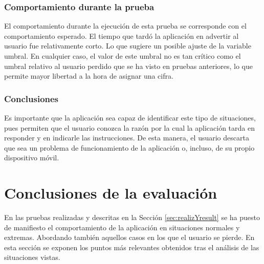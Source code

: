 \subsubsection*{Comportamiento durante la prueba}

El comportamiento durante la ejecución de esta prueba se corresponde con el comportamiento esperado. El tiempo que tardó la aplicación en advertir al usuario fue relativamente corto. Lo que sugiere un posible ajuste de la variable umbral. En cualquier caso, el valor de este umbral no es tan crítico como el umbral relativo al usuario perdido que se ha visto en pruebas anteriores, lo que permite mayor libertad a la hora de asignar una cifra.

\subsubsection*{Conclusiones}

Es importante que la aplicación sea capaz de identificar este tipo de situaciones, pues permiten que el usuario conozca la razón por la cual la aplicación tarda en responder y en indicarle las instrucciones. De esta manera, el usuario descarta que sea un problema de funcionamiento de la aplicación o, incluso, de su propio dispositivo móvil. 


\section{Conclusiones de la evaluación}
\label{sec:conclusionesEval}

En las pruebas realizadas y descritas en la Sección \ref{sec:realizYresult} se ha puesto de manifiesto el comportamiento de la aplicación en situaciones normales y extremas. Abordando también aquellos casos en los que el usuario se pierde. En esta sección se exponen los puntos más relevantes obtenidos tras el análisis de las situaciones vistas.


